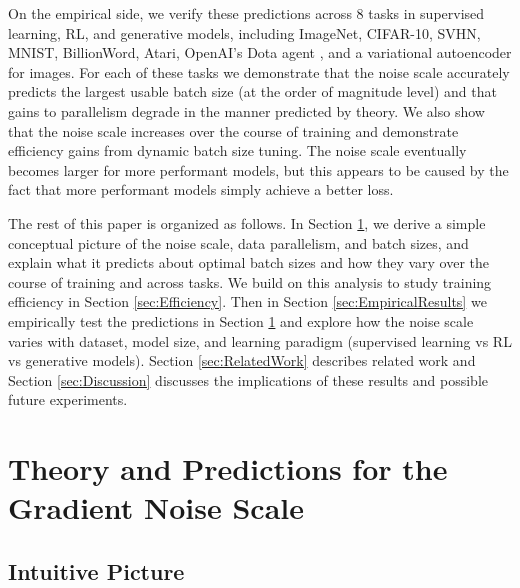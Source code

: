 \documentclass[english]{article}
\begin{document}
On the empirical side, we verify these predictions across 8 tasks in supervised learning, RL, and generative models, including ImageNet, CIFAR-10, SVHN, MNIST, BillionWord, Atari, %
OpenAI's Dota agent \cite{OpenAI_Five}, and a variational autoencoder for images. For each of these tasks we demonstrate that the noise scale accurately predicts the largest usable batch size (at the order of magnitude level) and that gains to parallelism degrade in the manner predicted by theory. We also show that the noise scale increases over the course of training and demonstrate efficiency gains from dynamic batch size tuning.
The noise scale eventually becomes larger for more performant models, but this appears to be caused by the fact that more performant models simply achieve a better loss. %



The rest of this paper is organized as follows. In Section \ref{sec:ParallelismandNoise}, we derive a simple conceptual picture of the noise scale, data parallelism, and batch sizes, and explain what it predicts about optimal batch sizes and how they vary over the course of training and across tasks. We build on this analysis to study training efficiency in Section \ref{sec:Efficiency}. Then in Section \ref{sec:EmpiricalResults} we empirically test the predictions in Section \ref{sec:ParallelismandNoise} and explore how the noise scale varies with dataset, model size, and learning paradigm (supervised learning vs RL vs generative models). Section \ref{sec:RelatedWork} describes related work and Section \ref{sec:Discussion} discusses the implications of these results and possible future experiments.


\section{Theory and Predictions for the Gradient Noise Scale}

\label{sec:ParallelismandNoise}

\subsection{Intuitive Picture}

\label{subsec:IntuitivePicture}
\end{document}

